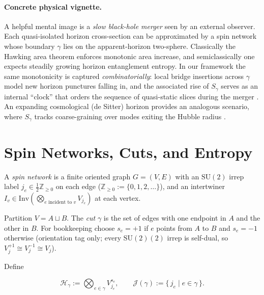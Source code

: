 \documentclass[11pt]{article}
\newcommand{\SU}{\mathrm{SU}(2)}
\newcommand{\Hil}{\mathcal{H}}
\newcommand{\Inv}{\mathrm{Inv}}
\newcommand{\Cut}{\gamma}
\newcommand{\JS}{\mathcal{J}} %
\newcommand{\NN}{\mathbb{Z}_{\ge 0}}
\begin{document}
\paragraph{Concrete physical vignette.}

A helpful mental image is a \emph{slow black-hole merger} seen 
by an external observer. Each quasi-isolated horizon cross-section can be approximated by a
spin network whose boundary $\Cut$ lies on the apparent-horizon two-sphere.
Classically the Hawking area theorem enforces monotonic area increase, and
semiclassically one expects steadily growing horizon entanglement entropy.
In our framework the same monotonicity is captured \emph{combinatorially}:
local bridge insertions across $\Cut$ model new horizon punctures falling
in, and the associated rise of $S_{\Cut}$ serves as an internal “clock” that
orders the sequence of quasi-static slices during the merger 
\cite{AshtekarKrishnan2004,BoothFairhurst2007}. An expanding cosmological
(de Sitter) horizon provides an analogous scenario, where $S_{\Cut}$
tracks coarse-graining over modes exiting the Hubble radius
\cite{GibbonsHawking1977}.




\section{Spin Networks, Cuts, and Entropy}

\begin{definition}\label{def:spinnet}
A \emph{spin network} is a finite oriented graph $G=(V,E)$ with an $\SU$ irrep label $j_e\in\tfrac{1}{2}\NN$ on each edge ($\NN:=\{0,1,2,\dots\}$), and an intertwiner $I_v\in\Inv\left(\bigotimes_{\text{$e$ incident to }v}V_{j_e}\right)$ at each vertex.
\end{definition}

\begin{definition}\label{def:cut} Partition $V=A\sqcup B$. The \emph{cut} $\Cut$ is the set of edges with one endpoint in $A$ and the other in $B$. For bookkeeping choose $s_e=+1$ if $e$ points from $A$ to $B$ and $s_e=-1$ otherwise (orientation tag only; every $\SU(2)$ irrep is self-dual, so $V_j^{+1}\!\cong V_j^{-1}\!\cong V_j$).

Define

\[\Hil_{\Cut}:=\bigotimes_{e\in\Cut} V_{j_e}^{s_e},\qquad \JS(\Cut):=\{\,j_e\mid e\in\Cut\,\}.\]

\end{definition}
\end{document}
